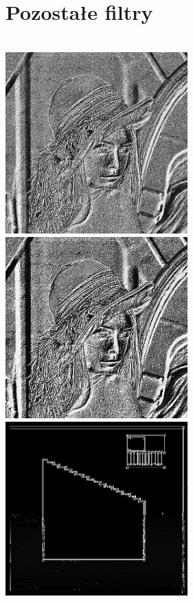 \documentclass[a4paper,12pt,openany]{report}
\begin{document}
\pagebreak
\section{Pozostałe filtry}

\begin{center}
\\
\includegraphics[width=7cm]{resources/modified/lena/lena_emboss_1.jpg}
\includegraphics[width=7cm]{resources/modified/lena/lena_emboss_2.jpg}
\includegraphics[width=7cm]{resources/modified/sample/sample_emboss_1.jpg}

\end{center}
\end{document}
